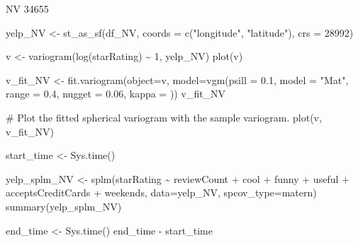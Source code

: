 \documentclass[
  12pt,
  letterpaper,
  DIV=11,
  numbers=noendperiod]{scrartcl}
\newenvironment{Shaded}{\begin{snugshade}}{\end{snugshade}}
\newcommand{\AttributeTok}[1]{\textcolor[rgb]{0.98,0.46,0.51}{#1}}
\newcommand{\CommentTok}[1]{\textcolor[rgb]{0.42,0.45,0.49}{#1}}
\newcommand{\DecValTok}[1]{\textcolor[rgb]{0.47,0.72,1.00}{#1}}
\newcommand{\FloatTok}[1]{\textcolor[rgb]{0.47,0.72,1.00}{#1}}
\newcommand{\FunctionTok}[1]{\textcolor[rgb]{0.70,0.57,0.94}{#1}}
\newcommand{\NormalTok}[1]{\textcolor[rgb]{0.88,0.89,0.91}{#1}}
\newcommand{\OtherTok}[1]{\textcolor[rgb]{0.70,0.57,0.94}{#1}}
\newcommand{\SpecialCharTok}[1]{\textcolor[rgb]{0.47,0.72,1.00}{#1}}
\newcommand{\StringTok}[1]{\textcolor[rgb]{0.62,0.80,1.00}{#1}}
\begin{document}
NV 34655

\begin{Shaded}
\begin{Highlighting}[]
\NormalTok{yelp\_NV }\OtherTok{\textless{}{-}} \FunctionTok{st\_as\_sf}\NormalTok{(df\_NV, }\AttributeTok{coords =} \FunctionTok{c}\NormalTok{(}\StringTok{"longitude"}\NormalTok{, }\StringTok{"latitude"}\NormalTok{), }\AttributeTok{crs =} \DecValTok{28992}\NormalTok{)}
\end{Highlighting}
\end{Shaded}

\begin{Shaded}
\begin{Highlighting}[]
\NormalTok{v }\OtherTok{\textless{}{-}} \FunctionTok{variogram}\NormalTok{(}\FunctionTok{log}\NormalTok{(starRating) }\SpecialCharTok{\textasciitilde{}} \DecValTok{1}\NormalTok{, yelp\_NV)}
\FunctionTok{plot}\NormalTok{(v)}
\end{Highlighting}
\end{Shaded}

\begin{Shaded}
\begin{Highlighting}[]
\NormalTok{v\_fit\_NV }\OtherTok{\textless{}{-}} \FunctionTok{fit.variogram}\NormalTok{(}\AttributeTok{object=}\NormalTok{v, }
                           \AttributeTok{model=}\FunctionTok{vgm}\NormalTok{(}\AttributeTok{psill =} \FloatTok{0.1}\NormalTok{, }\AttributeTok{model =} \StringTok{"Mat"}\NormalTok{, }
                                     \AttributeTok{range =} \FloatTok{0.4}\NormalTok{, }\AttributeTok{nugget =} \FloatTok{0.06}\NormalTok{, }\AttributeTok{kappa =}\NormalTok{ ))}
\NormalTok{v\_fit\_NV}

\CommentTok{\# Plot the fitted spherical variogram with the sample variogram.}
\FunctionTok{plot}\NormalTok{(v, v\_fit\_NV)}
\end{Highlighting}
\end{Shaded}

\begin{Shaded}
\begin{Highlighting}[]
\NormalTok{start\_time }\OtherTok{\textless{}{-}} \FunctionTok{Sys.time}\NormalTok{()}


\NormalTok{yelp\_splm\_NV }\OtherTok{\textless{}{-}} \FunctionTok{splm}\NormalTok{(starRating }\SpecialCharTok{\textasciitilde{}}\NormalTok{ reviewCount }\SpecialCharTok{+}\NormalTok{ cool }\SpecialCharTok{+}\NormalTok{ funny }\SpecialCharTok{+}\NormalTok{ useful }\SpecialCharTok{+}\NormalTok{ acceptsCreditCards }\SpecialCharTok{+}\NormalTok{ weekends, }\AttributeTok{data=}\NormalTok{yelp\_NV, }\AttributeTok{spcov\_type=}\StringTok{\textquotesingle{}matern\textquotesingle{}}\NormalTok{)}
\FunctionTok{summary}\NormalTok{(yelp\_splm\_NV)}

\NormalTok{end\_time }\OtherTok{\textless{}{-}} \FunctionTok{Sys.time}\NormalTok{()}
\NormalTok{end\_time }\SpecialCharTok{{-}}\NormalTok{ start\_time}
\end{Highlighting}
\end{Shaded}
\end{document}

